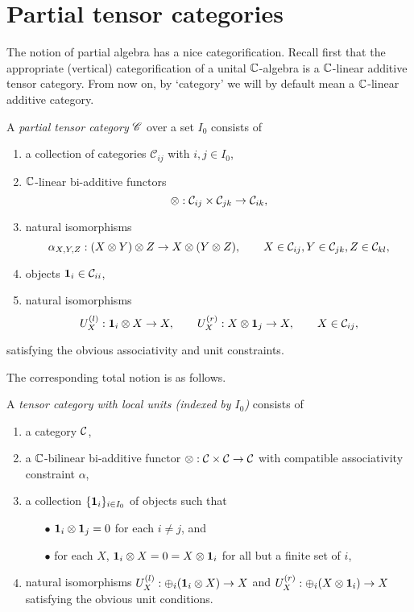 \section{Partial tensor categories}


The notion of partial algebra has a nice categorification. %
Recall first that the appropriate (vertical) categorification of a unital $\mathbb{C}$-algebra is a $\mathbb{C}$-linear additive tensor category. From now on, by `category' we will by default mean a $\mathbb{C}$-linear additive category. 

\begin{Def} A \emph{partial tensor category} $\mathscr{C}$ over a set $I_0$ consists of 
\begin{enumerate}[label=(\alph*)]
\item a collection of categories $\mathcal{C}_{ij}$ with $i,j\in I_0$, 
\item $\mathbb{C}$-linear bi-additive functors \[\otimes: \mathcal{C}_{ij}\times \mathcal{C}_{jk}\rightarrow \mathcal{C}_{ik},\] 
\item natural isomorphisms \[ \alpha_{X,Y,Z}: (X\otimes Y)\otimes Z \rightarrow X\otimes (Y\otimes Z),\qquad X \in \mathcal{C}_{ij},Y\in \mathcal{C}_{jk},Z\in \mathcal{C}_{kl},\] 
\item objects $\mathbf{1}_{i} \in \mathcal{C}_{ii}$,
\item natural isomorphisms \[U_X^{(l)}:\mathbf{1}_i\otimes X \rightarrow X,\qquad U_X^{(r)}:X\otimes \mathbf{1}_j\rightarrow X, \qquad X\in \mathcal{C}_{ij},\]
\end{enumerate}
satisfying the obvious associativity and unit constraints. 
\end{Def}

The corresponding total notion is as follows. 

\begin{Def} A \emph{tensor category with local units (indexed by $I_0$)} consists of
\begin{enumerate}[label=(\alph*)]
\item a category $\mathcal{C}$, 
\item a $\mathbb{C}$-bilinear bi-additive functor $\otimes: \mathcal{C}\times \mathcal{C} \rightarrow \mathcal{C}$ with compatible associativity constraint $\alpha$, 
\item\label{FinSup} a collection $\{\mathbf{1}_i\}_{i\in I_0}$ of objects such that 
\begin{itemize}\item[$\bullet$] $\mathbf{1}_i\otimes \mathbf{1}_j = 0$ for each $i\neq j$, and
\item[$\bullet$] for each $X$,  $\mathbf{1}_i\otimes X = 0 = X\otimes \mathbf{1}_i$ for all but a finite set of $i$,
\end{itemize}
\item\label{UnCon} natural isomorphisms $U_X^{(l)}:\oplus_i (\mathbf{1}_i\otimes X) \rightarrow X$ and $U_X^{(r)}:\oplus_i(X\otimes \mathbf{1}_i)\rightarrow X$ satisfying the obvious unit conditions. 
\end{enumerate} 
\end{Def}

